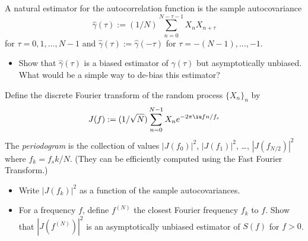 \documentclass[11pt]{article}
\begin{document}
\begin{solution}

\end{solution}


\begin{exercise}
A natural estimator for the autocorrelation function is the sample autocovariance
\begin{equation}
    \hat{\gamma}(\tau) := (1/N) \sum_{n=0}^{N-\tau-1} X_n X_{n+\tau}
\end{equation}
for $\tau=0,1,\dots,N-1$ and $\hat{\gamma}(\tau):=\hat{\gamma}(-\tau)$ for $\tau=-(N-1),\dots,-1$.
\begin{itemize}
    \item Show that $\hat{\gamma}(\tau)$ is a biased estimator of $\gamma(\tau)$ but asymptotically unbiased.
    What would be a simple way to de-bias this estimator?
\end{itemize}

\end{exercise}

\begin{solution}

\end{solution}

\begin{exercise}
Define the discrete Fourier transform of the random process $\{X_n\}_n$ by
\begin{equation}
    J(f) := (1/\sqrt{N})\sum_{n=0}^{N-1} X_n e^{-2\pi\iu f n/f_s}
\end{equation}
The \textit{periodogram} is the collection of values $|J(f_0)|^2$, $|J(f_1)|^2$, \dots, $|J(f_{N/2})|^2$ where $f_k = f_s k/N$.
(They can be efficiently computed using the Fast Fourier Transform.)
\begin{itemize}
    \item Write $|J(f_k)|^2$ as a function of the sample autocovariances.
    \item For a frequency $f$, define $f^{(N)}$ the closest Fourier frequency $f_k$ to $f$.
    Show that $|J(f^{(N)})|^2$ is an asymptotically unbiased estimator of $S(f)$ for $f>0$.
\end{itemize}
\end{exercise}

\begin{solution}
    
\end{solution}
\end{document}
